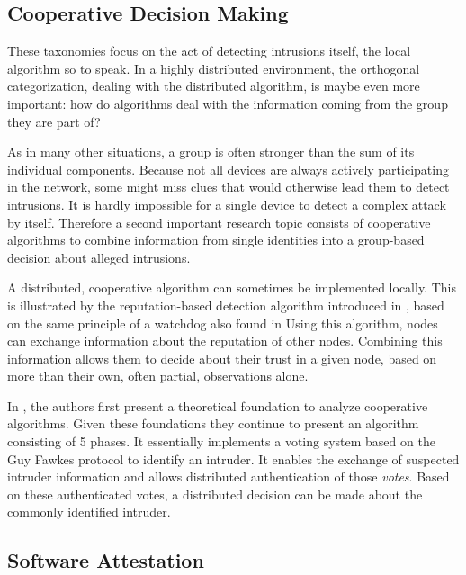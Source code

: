 \documentclass[conference]{IEEEtran}
\begin{document}
\subsection{Cooperative Decision Making}
\label{coorperative}

These taxonomies focus on the act of detecting intrusions itself, the local
algorithm so to speak. In a highly distributed environment, the orthogonal
categorization, dealing with the distributed algorithm, is maybe even more
important: how do algorithms deal with the information coming from the group
they are part of?

As in many other situations, a group is often stronger than the sum of its
individual components. Because not all devices are always actively
participating in the network, some might miss clues that would otherwise lead
them to detect intrusions. It is hardly impossible for a single device to
detect a complex attack by itself. Therefore a second important research topic
consists of cooperative algorithms to combine information from single
identities into a group-based decision about alleged
intrusions\cite{zhang2000intrusion}.

A distributed, cooperative algorithm can sometimes be implemented locally. This
is illustrated by the reputation-based detection algorithm introduced in
\cite{ganeriwal2008reputation}, based on the same principle of a watchdog also
found in \cite{mishra2004intrusion} Using this algorithm, nodes can exchange
information about the reputation of other nodes. Combining this information
allows them to decide about their trust in a given node, based on more than
their own, often partial, observations alone.

In \cite{krontiris2009cooperative}, the authors first present a theoretical
foundation to analyze cooperative algorithms. Given these foundations they
continue to present an algorithm consisting of 5 phases. It essentially
implements a voting system based on the Guy Fawkes
protocol\cite{anderson1998new} to identify an intruder. It enables the exchange
of suspected intruder information and allows distributed authentication of
those \emph{votes}. Based on these authenticated votes, a distributed decision
can be made about the commonly identified intruder.

\subsection{Software Attestation}
\label{subsection:attestation}
\end{document}
